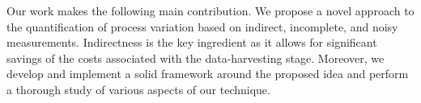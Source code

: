 Our work makes the following main contribution.
We propose a novel approach to the quantification of process variation based on indirect, incomplete, and noisy measurements.
Indirectness is the key ingredient as it allows for significant savings of the costs associated with the data-harvesting stage.
Moreover, we develop and implement a solid framework around the proposed idea and perform a thorough study of various aspects of our technique.
